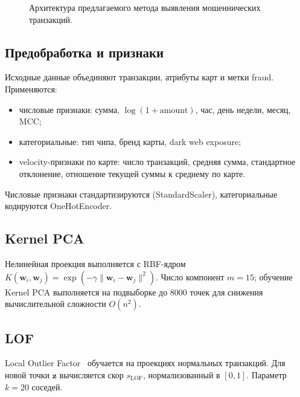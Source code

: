 \documentclass[12pt,a4paper]{article}
\begin{document}
\begin{figure}[ht]
  \centering
  \caption{Архитектура предлагаемого метода выявления мошеннических транзакций.}
  \label{fig:pipeline}
\end{figure}

\subsection{Предобработка и признаки}

Исходные данные объединяют транзакции, атрибуты карт и метки fraud.
Применяются:
\begin{itemize}
  \item числовые признаки: сумма, $\log(1+\text{amount})$, час, день недели, месяц, MCC;
  \item категориальные: тип чипа, бренд карты, dark web exposure;
  \item velocity-признаки по карте: число транзакций, средняя сумма, стандартное отклонение,
        отношение текущей суммы к среднему по карте.
\end{itemize}
Числовые признаки стандартизируются (StandardScaler), категориальные кодируются OneHotEncoder.

\subsection{Kernel PCA}

Нелинейная проекция выполняется с RBF-ядром
$K(\mathbf{w}_i, \mathbf{w}_j) = \exp(-\gamma \|\mathbf{w}_i - \mathbf{w}_j\|^2)$.
Число компонент $m=15$; обучение Kernel PCA выполняется на подвыборке до 8000 точек
для снижения вычислительной сложности $O(n^2)$.

\subsection{LOF}

Local Outlier Factor~\cite{breunig2000} обучается на проекциях нормальных транзакций.
Для новой точки $\mathbf{z}$ вычисляется скор $s_{\mathrm{LOF}}$, нормализованный в $[0,1]$.
Параметр $k=20$ соседей.
\end{document}
